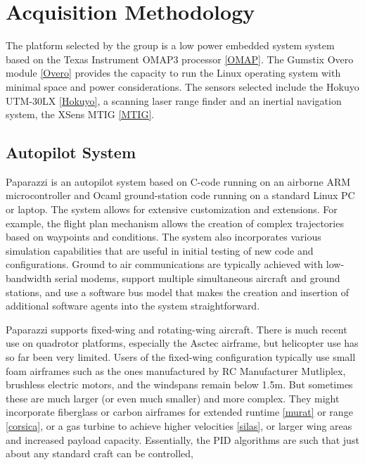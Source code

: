 \documentclass[a4paper,11pt]{report}
\begin{document}
\section{Acquisition Methodology}

The platform selected by the group is a low power embedded system system based on the Texas Instrument OMAP3 processor \ref{OMAP}. The Gumstix Overo module \ref{Overo} provides the capacity to run the Linux operating system with minimal space and power considerations. The sensors selected include the Hokuyo UTM-30LX \ref{Hokuyo}, a scanning laser range finder and an inertial navigation system, the XSens MTIG \ref{MTIG}.

\subsection{Autopilot System}

Paparazzi is an autopilot system based on C-code running on an airborne ARM microcontroller and Ocaml ground-station code running on a standard Linux PC or laptop. The system allows for extensive customization and extensions. For example, the flight plan mechanism allows the creation of complex trajectories based on waypoints and conditions. The system also incorporates various simulation capabilities that are useful in initial testing of new code and configurations. Ground to air communications are typically achieved with low-bandwidth serial modems, support multiple simultaneous aircraft and ground stations, and use a software bus model that makes the creation and insertion of additional software agents into the system straightforward. 

Paparazzi supports fixed-wing and rotating-wing aircraft. There is much recent use on quadrotor platforms, especially the Asctec airframe, but helicopter use has so far been very limited. Users of the fixed-wing configuration typically use small foam airframes such as the ones manufactured by RC Manufacturer Mutliplex, brushless electric motors, and the windspans remain below 1.5m. But sometimes these are much larger (or even much smaller) and more complex. They might incorporate fiberglass or carbon airframes for extended runtime \ref{murat} or range \ref{corsica}, or a gas turbine to achieve higher velocities \ref{silas}, or larger wing areas and increased payload capacity. Essentially, the PID algorithms are such that just about any standard craft can be controlled,
\end{document}
